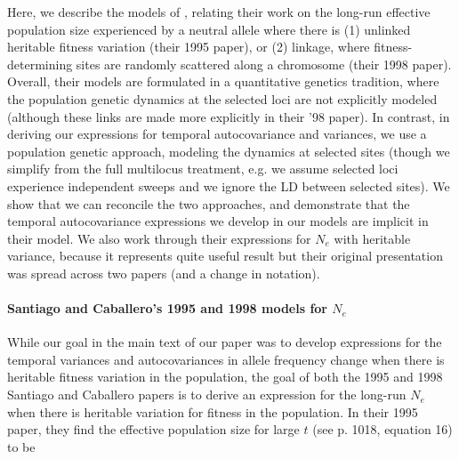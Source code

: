 \documentclass[11pt]{article}
\begin{document}
Here, we describe the models of \textcite{Santiago1995-hx,Santiago1998-bs},
relating their work on the long-run effective population size experienced by a
neutral allele where there is (1) unlinked heritable fitness variation (their
1995 paper), or (2) linkage, where fitness-determining sites are randomly
scattered along a chromosome (their 1998 paper). Overall, their models are
formulated in a quantitative genetics tradition, where the population genetic
dynamics at the selected loci are not explicitly modeled (although these links
are made more explicitly in their '98 paper). In contrast, in deriving our
expressions for temporal autocovariance and variances, we use a population
genetic approach, modeling the dynamics at selected sites (though we simplify
from the full multilocus treatment, e.g. we assume selected loci experience
independent sweeps and we ignore the LD between selected sites). We show that
we can reconcile the two approaches, and demonstrate that the temporal
autocovariance expressions we develop in our models are implicit in their
model. We also work through their expressions for $N_e$ with heritable
variance, because it represents quite useful result but their original
presentation was spread across two papers (and a change in notation).

\paragraph{Santiago and Caballero's 1995 and 1998 models for $N_e$}

While our goal in the main text of our paper was to develop expressions for the
temporal variances and autocovariances in allele frequency change when there is
heritable fitness variation in the population, the goal of both the 1995 and
1998 Santiago and Caballero papers is to derive an expression for the long-run
$N_e$ when there is heritable variation for fitness in the population. In their
1995 paper, they find the effective population size for large $t$ (see p. 1018,
equation 16) to be
\end{document}

